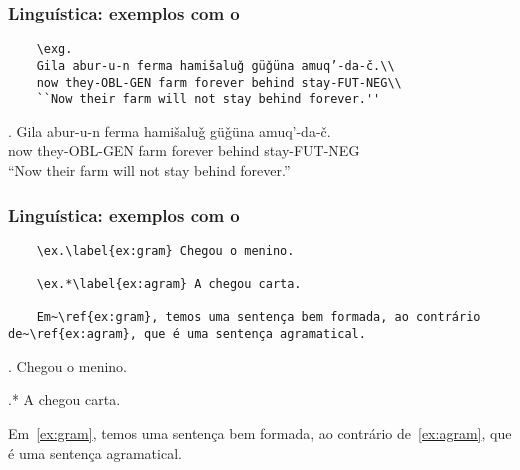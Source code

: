 \begin{frame}[fragile]
  \frametitle{Linguística: exemplos com o }
  \small

  \begin{verbatim}
    \exg.
    Gila abur-u-n ferma hamišaluǧ güǧüna amuq’-da-č.\\
    now they-OBL-GEN farm forever behind stay-FUT-NEG\\
    ``Now their farm will not stay behind forever.''
  \end{verbatim}

  \exg.
  Gila abur-u-n ferma hamišaluǧ güǧüna amuq’-da-č.\\
  now they-OBL-GEN farm forever behind stay-FUT-NEG\\
  ``Now their farm will not stay behind forever.''

\end{frame}

\begin{frame}[fragile]
  \frametitle{Linguística: exemplos com o }
  \normalsize

  \begin{verbatim}
    \ex.\label{ex:gram} Chegou o menino.

    \ex.*\label{ex:agram} A chegou carta.

    Em~\ref{ex:gram}, temos uma sentença bem formada, ao contrário de~\ref{ex:agram}, que é uma sentença agramatical.
  \end{verbatim}

  \vfill

  \ex.\label{ex:gram} Chegou o menino.

  \ex.*\label{ex:agram} A chegou carta.

  Em~\ref{ex:gram}, temos uma sentença bem formada, ao contrário
  de~\ref{ex:agram}, que é uma sentença agramatical.

\end{frame}
